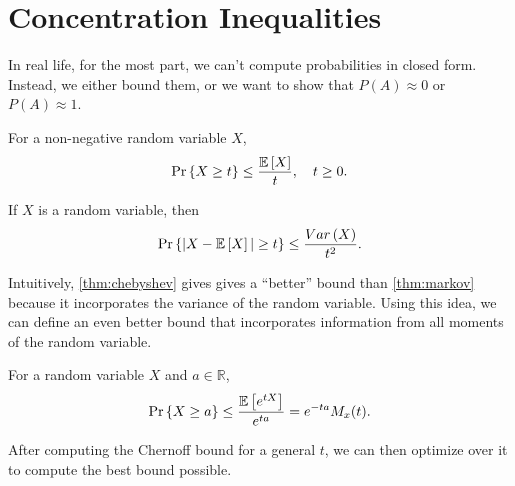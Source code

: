 \section{Concentration Inequalities}
In real life, for the most part, we can't compute probabilities in closed form.
Instead, we either bound them, or we want to show that $P(A) \approx 0$ or $P(A) \approx 1$.
\begin{theorem}
  For a non-negative random variable $X$,
  \[
	\text{Pr}\left\{X \geq t\right\} \leq \frac{\mathbb{E}\left[X\right]}{t}, \quad t \geq 0.
  \]
  \label{thm:markov}
\end{theorem}
\begin{theorem}
  If $X$ is a random variable, then
  \[
	\text{Pr}\left\{|X - \mathbb{E}\left[X\right]| \geq t\right\} \leq \frac{Var\left(X\right)}{t^2}.
  \]
  \label{thm:chebyshev}
\end{theorem}
Intuitively, \cref{thm:chebyshev} gives gives a ``better'' bound than \cref{thm:markov} because it incorporates the variance of the random variable.
Using this idea, we can define an even better bound that incorporates information from all moments of the random variable.
\begin{definition}
	For a random variable $X$ and $a\in\mathbb{R}$,\[
		\text{Pr}\left\{X \geq a\right\} \leq \frac{\mathbb{E}\left[e^{tX}\right]}{e^{ta}} = e^{-ta}M_x(t).
	\]
	\label{defn:chernoff}
\end{definition}
After computing the Chernoff bound for a general $t$, we can then optimize over it to compute the best bound possible.

